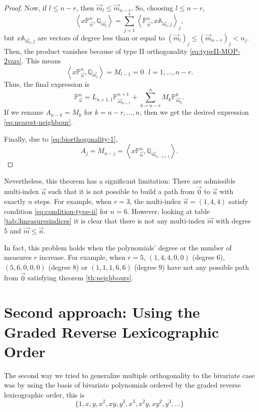 \documentclass[12pt,a4]{report}
\theoremstyle{plain}
\newcommand{\prodesc}[2]{\left\langle #1 , #2 \right\rangle}
\begin{document}
\begin{proof}
    Now, if $l\leq n-r$, then $\overrightarrow{m}_l\leq \overrightarrow{m}_{n-r}$. So, choosing $l\leq n-r$,
    $$
    \prodesc{x\mathbb P_{\vec n}^n}{\mathbb Q_{\overrightarrow{m}_l}} = \sum_{j=1}^r  \prodesc{\mathbb P_{\vec n}^n}{x\mathbb A_{\overrightarrow{m}_l,j}}_j,
    $$
    but $x\mathbb A_{\overrightarrow{m}_l,j}$ are vectors of degree less than or equal to $(\overrightarrow{m}_l)_j\leq (\overrightarrow{m}_{n-r})_j < n_j$. Then, the product vanishes because of type II orthogonality \eqref{eq:typeII-MOP-2vars}. This means
    $$
    \prodesc{x\mathbb P_{\vec n}^n}{\mathbb Q_{\overrightarrow{m}_l}} = M_{l-1} = 0 \ \ \ l = 1, \dots, n-r.
    $$
    Thus, the final expression is
    $$
    \mathbb P_{\overrightarrow{n}}^n = L_{n+1,1}\mathbb P_{\overrightarrow{m}_{n+1}}^{n+1} + \sum_{k=n-r}^{n} M_k \mathbb P_{\overrightarrow{m}_k}^k.
    $$
    If we rename $A_{n-k} = M_k$ for $k=n-r,...,n$, then we get the desired expression \eqref{eq:nearest-neighbour}. 

    Finally, due to \eqref{eq:biorthogonality-1}, $$A_j = M_{n-j} =  \prodesc{x\mathbb P_{\vec n}^n}{\mathbb Q_{\overrightarrow{m}_{n-j+1}}}.$$
\end{proof}

Nevertheless, this theorem has a significant limitation: There are admissible multi-index $\vec n$ such that it is not possible to build a path from $\vec 0$ to $\vec n$ with exactly $n$ steps. For example, when $r=3$, the multi-index $\vec n =(1,4,4)$ satisfy condition \eqref{eq:condition-type-ii} for $n=6$. However, looking at table \ref{tab:3measuresindices} it is clear that there is not any multi-index $\vec m$ with degree 5 and $\vec m \leq \vec n$. 

In fact, this problem holds when the polynomials' degree or the number of measures $r$ increase. For example, when $r=5$, $(1,4,4,0,0)$ (degree 6), $(5,6,0,0,0)$ (degree 8) or $(1,1,1,6,6)$ (degree 9) have not any possible path from $\vec 0$ satisfying theorem \ref{th:neighbours}.


\chapter{Second approach: Using the Graded Reverse Lexicographic Order}
\label{chap:II}

The second way we tried to generalize multiple orthogonality to the bivariate case was by using the basis of bivariate polynomials ordered by the graded reverse lexicographic order, this is
$$\{1,x,y,x^2,xy,y^2,x^3,x^2y,xy^2,y^3,\dots\}$$
\end{document}
